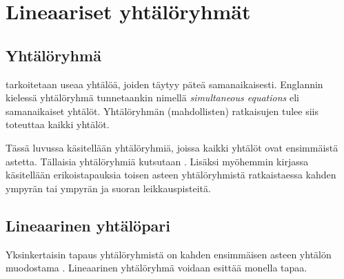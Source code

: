 \section{Lineaariset yhtälöryhmät} %


\subsection*{Yhtälöryhmä}

 tarkoitetaan useaa yhtälöä, joiden täytyy
päteä samanaikaisesti. Englannin kielessä yhtälöryhmä tunnetaankin nimellä
\textit{simultaneous equations} eli samanaikaiset yhtälöt.
Yhtälöryhmän (mahdollisten) ratkaisujen tulee siis toteuttaa kaikki yhtälöt.

Tässä luvussa käsitellään yhtälöryhmiä, joissa kaikki yhtälöt ovat ensimmäistä
astetta. Tällaisia yhtälöryhmiä kutsutaan .
Lisäksi myöhemmin kirjassa käsitellään erikoistapauksia toisen asteen yhtälöryhmistä
ratkaistaessa kahden ympyrän tai ympyrän ja suoran leikkauspisteitä.

\subsection*{Lineaarinen yhtälöpari}

Yksinkertaisin tapaus yhtälöryhmistä on kahden ensimmäisen asteen yhtälön
muodostama .
Lineaarinen yhtälöryhmä voidaan esittää monella tapaa.


